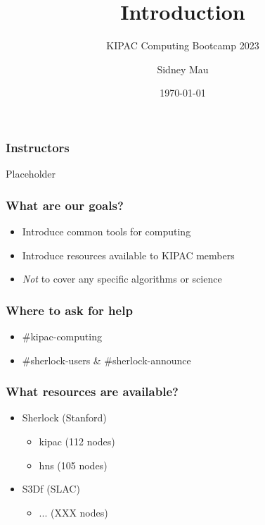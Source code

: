 \documentclass[aspectratio=169]{beamer}
\title{Introduction}
\subtitle{KIPAC Computing Bootcamp 2023}
\author[S. Mau]{Sidney Mau}
\institute[Stanford]{Stanford University}
\date[\today]{\today}
\begin{document}

\frame{\titlepage}



% 


\begin{frame}[t]
	\frametitle{Instructors}
	Placeholder
\end{frame}

\begin{frame}[t]
	\frametitle{What are our goals?}
	\begin{itemize}
		\item Introduce common tools for computing
		\item Introduce resources available to KIPAC members
		\item \emph{Not} to cover any specific algorithms or science
	\end{itemize}
\end{frame}

\begin{frame}[t]
	\frametitle{Where to ask for help}
	\begin{itemize}
		\item \#kipac-computing
		\item \#sherlock-users \& \#sherlock-announce
	\end{itemize}
\end{frame}

\begin{frame}[t]
	\frametitle{What resources are available?}
	\begin{itemize}
		\item Sherlock (Stanford)
			\begin{itemize}
				\item kipac (112 nodes)
				\item hns (105 nodes)
			\end{itemize}
		\item S3Df (SLAC)
			\begin{itemize}
				\item ... (XXX nodes)
			\end{itemize}
	\end{itemize}
\end{frame}
\end{document}
